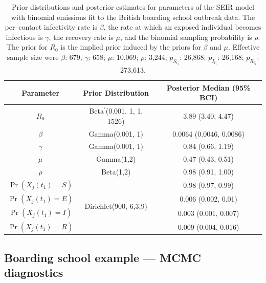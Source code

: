 \begin{table}[htbp]
	\begin{center}
		\begin{tabular}{ccc}
			\hline Parameter &  Prior Distribution & Posterior Median (95\% BCI)  \\ 
			\hline
			\hline $R_0$ & Beta$ ^\prime $(0.001, 1, 1, 1526) & 3.89 (3.40, 4.47) \\
			\hline $\beta$ & Gamma(0.001, 1) & 0.0064 (0.0046, 0.0086) \\ 
			\hline $ \gamma $ & Gamma(0.001, 1) & 0.84 (0.66, 1.19) \\
			\hline $\mu$ & Gamma(1,2) & 0.47 (0.43, 0.51) \\ 
			\hline $\rho $ & Beta(1,2) & 0.98 (0.91, 1.00)\\
			\hline $\Pr(X_j(t_1) = S)$& \multirow{4}{*}{Dirichlet(900, 6,3,9)} & 0.98 (0.97, 0.99) \\
			\hline $ \Pr(X_j(t_1) = E) $ & & 0.006 (0.002, 0.01)\\
			$\Pr(X_j(t_1) = I)$& & 0.003 (0.001, 0.007) \\
			$\Pr(X_j(t_1) = R)$&  & 0.009 (0.004, 0.016)\\
			\hline 
		\end{tabular}
		\caption{Prior distributions and posterior estimates for parameters of the SEIR model with binomial emissions fit to the British boarding school outbreak data. The per--contact infectivity rate is $ \beta $, the rate at which an exposed individual becomes infectious is $ \gamma $, the recovery rate is $ \mu $, and the binomial sampling probability is $ \rho $. The prior for $ R_0 $ is the implied prior induced by the priors for $ \beta $ and $ \mu $. Effective sample size were $\beta$: 679; $\gamma$: 658; $\mu$: 10,069; $ \rho $: 3,244; $p_{S_{t_1}}$: 26,868; $p_{I_{t_1}}$: 26,168; $p_{R_{t_1}}$: 273,613.}
		\label{tab:bbs_SEIR_prior_binom}
	\end{center}
\end{table}

\subsection{Boarding school example --- MCMC diagnostics}

